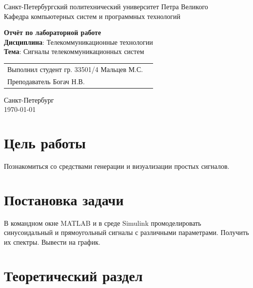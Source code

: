 \documentclass[a4paper,14pt]{extarticle}
\begin{document}
\begin{titlepage}
\centering
Санкт-Петербургский политехнический университет Петра Великого \\
\vspace{0.15cm}
Кафедра компьютерных систем и программных технологий \\
\vspace{6.5cm}

{\centering \textbf{Отчёт по лабораторной работе} \\ 
\vspace{0.15cm}
\textbf{Дисциплина}: Телекоммуникационные технологии \\
\vspace{0.15cm}
\textbf{Тема}: Сигналы телекоммуникационных
систем} \\

\vspace{6.5cm}

\begin{table}[H]
\begin{tabular}{p{\textwidth}@{}r}
{Выполнил студент гр. 33501/4} \hfill {Мальцев  М.С.} \\
{Преподаватель} \hfill {Богач Н.В.} \\
\end{tabular}
\end{table}
\vfill

{\centering Санкт-Петербург \\ 
\vspace{0.15cm}
\today}
\end{titlepage}

\tableofcontents
\newpage

\section{Цель работы}

Познакомиться со средствами генерации и визуализации простых сигналов.

\section{Постановка задачи}

В командном окне MATLAB и в среде Simulink промоделировать синусоидальный и прямоугольный сигналы с различными параметрами. Получить их спектры. Вывести на график.

\section{Теоретический раздел}
\end{document}
